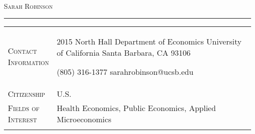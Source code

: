 \documentclass[11pt]{article}
\begin{document}
\thispagestyle{firstpage}

\begin{center}

{\Huge\textsc{Sarah Robinson}} \\[4pt]

\end{center}

\vspace{-6pt}

\noindent\rule{\textwidth}{1pt}

\vspace{4pt}

\begin{tabularx}{\textwidth}{@{}Y Z@{}}
	
	\textsc{Contact \newline Information} & 
	\begin{minipage}[t]{0.35\textwidth}
		2015 North Hall \newline
		Department of Economics \newline
		University of California \newline
		Santa Barbara, CA 93106
	\end{minipage}\begin{minipage}[t]{0.4\textwidth}
	 (805) 316-1377 \newline
	 sarahrobinson@ucsb.edu \newline
	 \href{https://www.s-robinson.com}{\color{blue}{www.s-robinson.com}}
	\end{minipage}
	\newline  \\ \addlinespace[10pt] 
	
	\textsc{Citizenship} & 
	U.S.
	\\ \addlinespace[15pt] 
	
	
	\textsc{Fields of \newline Interest} & 
	Health Economics, Public Economics, Applied Microeconomics
	 \\ \addlinespace[15pt] 
	

\end{tabularx}
\end{document}
